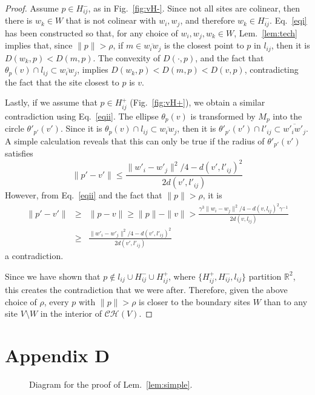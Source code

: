 \documentclass[11pt]{article}
\begin{document}
\begin{proof}
Assume $p\in  H^{-}_{ij}$, as in Fig.~\ref{fig:vH-}. 
Since not all sites are colinear, then there is $w_k\in W$ that is not colinear
with $w_i,w_j$, and therefore $w_k\in H^{-}_{ij}$. 
Eq.~\ref{eqi} has been constructed so that, for any choice of
$w_i,w_j,w_k\in W$, Lem.~\ref{lem:tech} implies that,
since $\|p\| > \rho$, if $m\in\overline{w_i w_j}$ is the
closest point to $p$ in $l_{ij}$, then it is $D(w_k,p) < D(m,p)$. 
The convexity of $D(\cdot,p)$, and the fact that
$\theta_p(v)\cap l_{ij}\subset\overline{w_i w_j}$, 
implies $D(w_k,p) <  D(m,p) < D(v,p)$, 
contradicting the fact that the site closest to $p$ is $v$. 


Lastly, if we assume that $p\in  H^{+}_{ij}$ (Fig.~\ref{fig:vH+}), 
we obtain a similar contradiction using Eq.~\ref{eqii}. 
The ellipse $\theta_p(v)$ is transformed by $M_p$ into the circle
$\theta'_{p'}(v')$. 
Since it is $\theta_p(v)\cap l_{ij}\subset \overline{w_i w_j}$, 
then it is  $\theta'_{p'}(v')\cap l'_{ij}\subset\overline{w'_i w'_j}$. 
A simple calculation reveals that this can only be true if the radius of
$\theta'_{p'}(v')$ satisfies
\[ \| p' - v'\| \le \frac{ \|w'_i-w'_j\|^2/4 - d(v',l'_{ij})^2 
	}{ 2 d(v',l'_{ij}) } \]
However, from Eq.~\ref{eqii} and the fact that $\|p\| > \rho$, it is 
\begin{eqnarray*}
	\| p' - v'\| &\ge& \|p - v\| \ge \|p\| - \|v\| 
> \frac{\gamma^3 \|w_i - w_j\|^2 / 4 - d(v,l_{ij})^2\gamma^{-1}}{ 2 d(v,l_{ij}) } \\
&\ge& \frac{ \|w'_i-w'_j\|^2/4 - d(v',l'_{ij})^2 }{ 2 d(v',l'_{ij}) }
\end{eqnarray*}
a contradiction. 

Since we have shown that $p\notin l_{ij}\cup  H^{-}_{ij}\cup H^{+}_{ij}$, 
where $\{H^{+}_{ij}, H^{-}_{ij}, l_{ij}\}$ partition $\mathbb{R}^2$, 
this creates the contradiction that we were after. 
Therefore, given the above choice of $\rho$, 
every $p$ with $\|p\| > \rho$ is closer to the boundary sites $W$ than to any
site $V\setminus W$ in the interior of $\mathcal{CH}(V)$. 
\end{proof}





\section*{Appendix D}\label{app:simple}

\begin{figure}[ht]
\centering
{}
\label{fig:subfigureExample}
\caption{Diagram for the proof of Lem.~\ref{lem:simple}.}
\end{figure}
\end{document}
